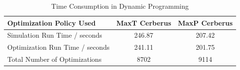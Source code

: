 
\begin{table}[!t] 
        \renewcommand{\arraystretch}{1.3}
        \caption{Time Consumption in Dynamic Programming}
        \label{Tab:OptimizationTime}
        \centering
        \begin{tabular}{l|c|c}
                \hline
                Optimization Policy Used & MaxT Cerberus & MaxP Cerberus \\
                \hline
                \hline
                Simulation Run Time / seconds & 246.87 & 207.42 \\
                Optimization Run Time / seconds & 241.11 & 201.75 \\
                Total Number of Optimizations & 8702 & 9114 \\
                \hline
        \end{tabular}
\end{table}


